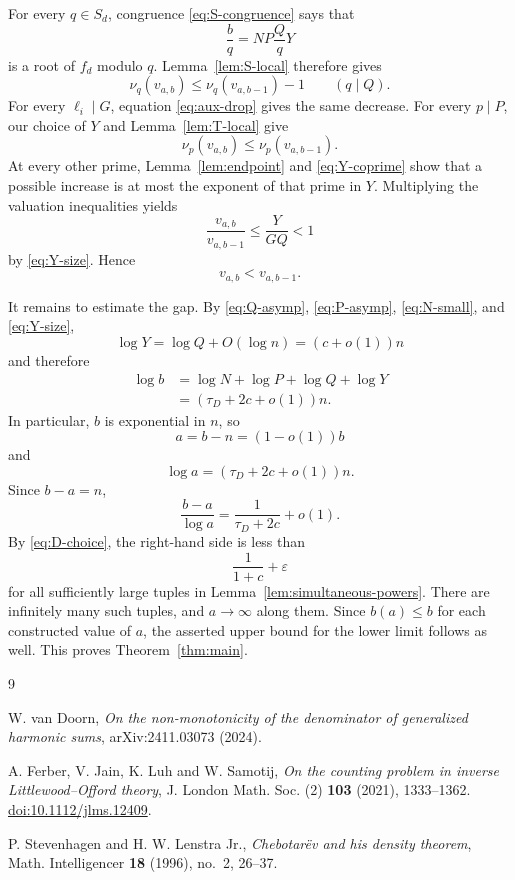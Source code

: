 \documentclass[11pt]{article}
\begin{document}
For every $q\in S_d$, congruence \eqref{eq:S-congruence} says that
\[
  \frac bq=NP\frac QqY
\]
is a root of $f_d$ modulo $q$. Lemma~\ref{lem:S-local} therefore gives
\begin{equation}\label{eq:Q-drop}
  \nu_q(v_{a,b})\leq\nu_q(v_{a,b-1})-1
  \qquad(q\mid Q).
\end{equation}
For every $\ell_i\mid G$, equation \eqref{eq:aux-drop} gives the same decrease. For every $p\mid P$, our choice of $Y$ and Lemma~\ref{lem:T-local} give
\begin{equation}\label{eq:P-neutral}
  \nu_p(v_{a,b})\leq\nu_p(v_{a,b-1}).
\end{equation}
At every other prime, Lemma~\ref{lem:endpoint} and \eqref{eq:Y-coprime} show that a possible increase is at most the exponent of that prime in $Y$. Multiplying the valuation inequalities yields
\begin{equation}\label{eq:ratio}
  \frac{v_{a,b}}{v_{a,b-1}}
  \leq\frac{Y}{GQ}<1
\end{equation}
by \eqref{eq:Y-size}. Hence
\[
  v_{a,b}<v_{a,b-1}.
\]

It remains to estimate the gap. By \eqref{eq:Q-asymp}, \eqref{eq:P-asymp}, \eqref{eq:N-small}, and \eqref{eq:Y-size},
\[
  \log Y=\log Q+O(\log n)=(c+o(1))n
\]
and therefore
\begin{equation}\label{eq:log-b}
\begin{aligned}
  \log b
  &=\log N+\log P+\log Q+\log Y\\
  &=(\tau_D+2c+o(1))n.
\end{aligned}
\end{equation}
In particular, $b$ is exponential in $n$, so
\[
  a=b-n=(1-o(1))b
\]
and
\[
  \log a=(\tau_D+2c+o(1))n.
\]
Since $b-a=n$,
\begin{equation}\label{eq:gap-limit}
  \frac{b-a}{\log a}
  =\frac1{\tau_D+2c}+o(1).
\end{equation}
By \eqref{eq:D-choice}, the right-hand side is less than
\[
  \frac1{1+c}+\varepsilon
\]
for all sufficiently large tuples in Lemma~\ref{lem:simultaneous-powers}. There are infinitely many such tuples, and $a\to\infty$ along them. Since $b(a)\leq b$ for each constructed value of $a$, the asserted upper bound for the lower limit follows as well. This proves Theorem~\ref{thm:main}.

\begin{thebibliography}{9}

W. van Doorn,
\emph{On the non-monotonicity of the denominator of generalized harmonic sums},
arXiv:2411.03073 (2024).

A. Ferber, V. Jain, K. Luh and W. Samotij,
\emph{On the counting problem in inverse Littlewood--Offord theory},
J. London Math. Soc. (2) \textbf{103} (2021), 1333--1362.
\href{https://doi.org/10.1112/jlms.12409}{doi:10.1112/jlms.12409}.

P. Stevenhagen and H. W. Lenstra Jr.,
\emph{Chebotar\"ev and his density theorem},
Math. Intelligencer \textbf{18} (1996), no.~2, 26--37.

\end{thebibliography}
\end{document}
